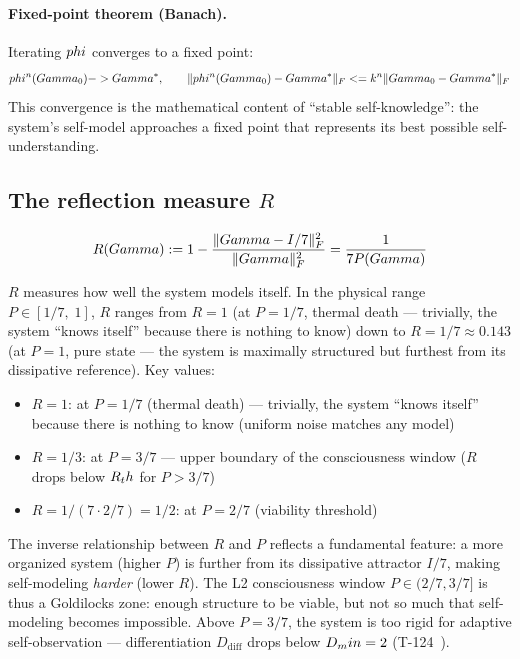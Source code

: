 \paragraph{Fixed-point theorem  (Banach).}
Iterating $phi$ converges to a fixed point:
\begin{equation}
  phi^n(Gamma_0) -> Gamma^*, \qquad
  \|phi^n(Gamma_0) - Gamma^*\|_F <= k^n \|Gamma_0 - Gamma^*\|_F
  \label{eq:fixed-point}
\end{equation}
This convergence is the mathematical content of ``stable self-knowledge'': the system's
self-model approaches a fixed point that represents its best possible self-understanding.

\subsection{The reflection measure $R$}
\label{subsec:reflection}

\begin{definition}
\begin{equation}
  R(Gamma) := 1 - \frac{\|Gamma - I/7\|_F^2}{\|Gamma\|_F^2} = \frac{1}{7P(Gamma)}
  \label{eq:reflection}
\end{equation}
\end{definition}

$R$ measures how well the system models itself. In the physical range
$P \in [1/7,\; 1]$, $R$ ranges from $R = 1$ (at $P = 1/7$, thermal death ---
trivially, the system ``knows itself'' because there is nothing to know) down
to $R = 1/7 \approx 0.143$ (at $P = 1$, pure state --- the system is maximally
structured but furthest from its dissipative reference). Key values:

\begin{itemize}[leftmargin=2em]
  \item $R = 1$: at $P = 1/7$ (thermal death) --- trivially, the system ``knows itself''
        because there is nothing to know (uniform noise matches any model)
  \item $R = 1/3$: at $P = 3/7$ --- upper boundary of the consciousness window
        ($R$ drops below $R_th$ for $P > 3/7$)
  \item $R = 1/(7 \cdot 2/7) = 1/2$: at $P = 2/7$ (viability threshold)
\end{itemize}

The inverse relationship between $R$ and $P$ reflects a fundamental feature: a more organized system (higher $P$) is further from its dissipative attractor $I/7$, making self-modeling \emph{harder} (lower $R$). The L2 consciousness window $P \in (2/7, 3/7]$ is thus a Goldilocks zone: enough structure to be viable, but not so much that self-modeling becomes impossible. Above $P = 3/7$, the system is too rigid for adaptive self-observation --- differentiation $D_{\mathrm{diff}}$ drops below $D_min = 2$ (T-124~).

